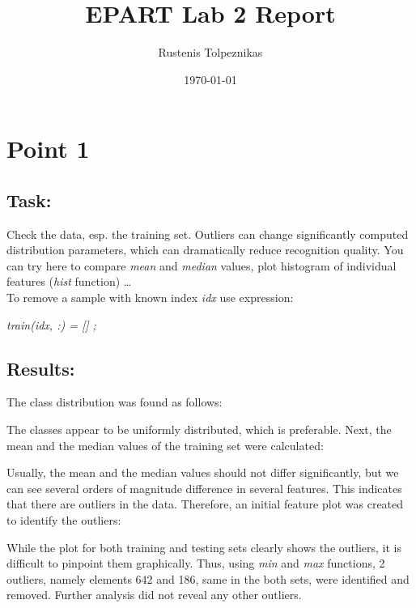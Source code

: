 \documentclass[
  a4paper,            %
  DIV=10,             %
  oneside,            %
  BCOR=5mm,           %
  parskip=half,       %
  numbers=noenddot,   %
  bibtotoc,           %
  listof=totoc        %
]{scrreprt}
\title{EPART Lab 2 Report}
\author{Rustenis Tolpeznikas}
\date{\today}
\begin{document}
\maketitle
\newpage

\section*{Point 1}
\subsection*{Task:}
Check the data, esp. the training set.
Outliers can change significantly computed distribution parameters, which can dramatically reduce recognition quality.
You can try here to compare \textit{mean} and \textit{median} values, plot histogram of individual features (\textit{hist} function) …
\\
To remove a sample with known index \textit{idx} use expression:
\begin{center}
    \textit{train(idx, :) = [] ;}
\end{center}

\subsection*{Results:}

The class distribution was found as follows:

The classes appear to be uniformly distributed, which is preferable.
Next, the mean and the median values of the training set were calculated:


Usually, the mean and the median values should not differ significantly, but we can see several orders of magnitude difference in several features.
This indicates that there are outliers in the data.
Therefore, an initial feature plot was created to identify the outliers:


While the plot for both training and testing sets clearly shows the outliers, it is difficult to pinpoint them graphically.
Thus, using \textit{min} and \textit{max} functions, 2 outliers, namely elements 642 and 186, same in the both sets, were identified and removed.
Further analysis did not reveal any other outliers.
\end{document}
